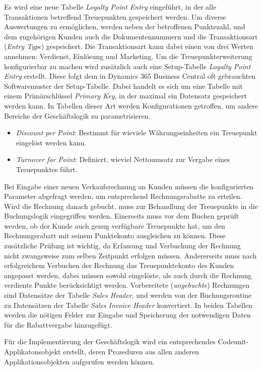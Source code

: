 Es wird eine neue Tabelle \textit{Loyalty Point Entry} eingeführt, in der alle Transaktionen betreffend Treuepunkten gespeichert werden. Um diverse Auswertungen zu ermöglichen, werden neben der betroffenen Punktezahl, und dem zugehörigen Kunden auch die Dokumentennummern und die Transaktionsart (\textit{Entry Type}) gespeichert. Die Transaktionsart kann dabei einen von drei Werten annehmen: Verdienst, Einlösung und Marketing. Um die Treuepunkterweiterung konfigurierbar zu machen wird zusätzlich auch eine Setup-Tabelle \textit{Loyalty Point Entry} erstellt. Diese folgt dem in Dynamics 365 Business Central oft gebrauchten Softwaremuster der Setup-Tabelle. Dabei handelt es sich um eine Tabelle mit einem Primärschlüssel \textit{Primary Key}, in der maximal ein Datensatz gespeichert werden kann. In Tabellen dieser Art werden Konfigurationen getroffen, um andere Bereiche der Geschäftslogik zu parametrisieren.

\begin{itemize}
	\item \textit{Discount per Point}: Bestimmt für wieviele Währungseinheiten ein Treuepunkt eingelöst werden kann.
	\item \textit{Turnover for Point}: Definiert, wieviel Nettoumsatz zur Vergabe eines Treuepunktes führt.
\end{itemize}

Bei Eingabe einer neuen Verkaufsrechnung an Kunden müssen die konfigurierten Parameter abgefragt werden, um entsprechend Rechnungsrabatte zu erteilen. Wird die Rechnung danach gebucht, muss zur Behandlung der Treuepunkte in die Buchungslogik eingegriffen werden. Einerseits muss vor dem Buchen geprüft werden, ob der Kunde auch genug verfügbare Treuepunkte hat, um den Rechnungsrabatt mit seinem Punktekonto ausgleichen zu können. Diese zusätzliche Prüfung ist wichtig, da Erfassung und Verbuchung der Rechnung nicht zwangsweise zum selben Zeitpunkt erfolgen müssen. Andererseits muss nach erfolgreichem Verbuchen der Rechnung das Treuepunktekonto des Kunden angepasst werden, dabei müssen sowohl eingelöste, als auch durch die Rechnung verdiente Punkte berücksichtigt werden. Vorbereitete (\textit{ungebuchte}) Rechnungen sind Datensätze der Tabelle \textit{Sales Header}, und werden von der Buchungsroutine zu Datensätzen der Tabelle \textit{Sales Invoice Header} konvertiert. In beiden Tabellen werden die nötigen Felder zur Eingabe und Speicherung der notwendigen Daten für die Rabattvergabe hinzugefügt.

Für die Implementierung der Geschäftslogik wird ein entsprechendes Codeunit-Applikatonsobjekt erstellt, deren Prozeduren aus allen anderen Applikationsobjekten aufgerufen werden können.

